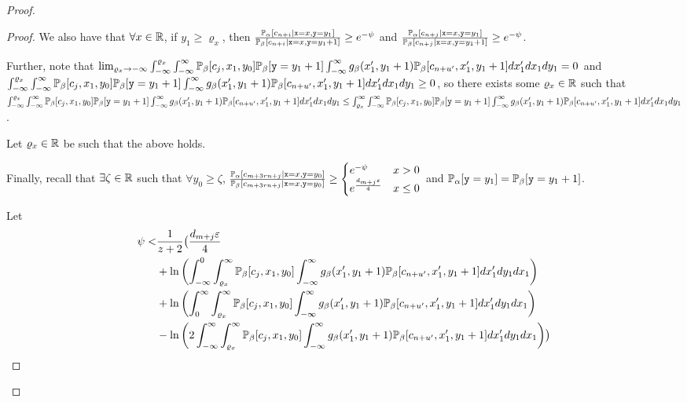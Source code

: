 \begin{proof}
\begin{proof}
		We also have that $\forall x\in \mathbb{R}$, if $y_1\geq \varrho_x$, then $\frac{\mathbb{P}_\alpha[c_{n+i}|\texttt{x}=x, \texttt{y}=y_1]}{\mathbb{P}_\beta[c_{n+i}|\texttt{x}=x, \texttt{y}=y_1+1]}\geq e^{-\psi}$ and $\frac{\mathbb{P}_\alpha[c_{n+j}|\texttt{x}=x, \texttt{y}=y_1]}{\mathbb{P}_\beta[c_{n+j}|\texttt{x}=x, \texttt{y}=y_1+1]}\geq e^{-\psi}$.

		Further, note that $
			\lim_{\varrho_x\to-\infty}\int_{-\infty}^{\varrho_x}\int_{-\infty}^{\infty}\mathbb{P}_\beta[c_{j}, x_1, y_0]\mathbb{P}_\beta[\texttt{y}=y_1+1]\int_{-\infty}^\infty g_\beta(x_1', y_1+1)\mathbb{P}_\beta[c_{n+u'}, x_1', y_1+1] dx_1' dx_1dy_1 = 0$ 
			and $\int_{-\infty}^{\varrho_x}\int_{-\infty}^{\infty}\mathbb{P}_\beta[c_{j}, x_1, y_0]\mathbb{P}_\beta[\texttt{y}=y_1+1]\int_{-\infty}^\infty g_\beta(x_1', y_1+1)\mathbb{P}_\beta[c_{n+u'}, x_1', y_1+1] dx_1' dx_1dy_1 \geq 0$,
		so there exists some $\varrho_x\in\mathbb{R}$ such that 
		$\int_{-\infty}^{\varrho_x}\int_{-\infty}^{\infty}\mathbb{P}_\beta[c_{j}, x_1, y_0]\mathbb{P}_\beta[\texttt{y}=y_1+1]\int_{-\infty}^\infty g_\beta(x_1', y_1+1)\mathbb{P}_\beta[c_{n+u'}, x_1', y_1+1] dx_1' dx_1dy_1 \leq \int_{\varrho_x}^\infty\int_{-\infty}^{\infty}\mathbb{P}_\beta[c_{j}, x_1, y_0]\mathbb{P}_\beta[\texttt{y}=y_1+1]\int_{-\infty}^\infty g_\beta(x_1', y_1+1)\mathbb{P}_\beta[c_{n+u'}, x_1', y_1+1] dx_1' dx_1dy_1$.

		Let $\varrho_x\in\mathbb{R}$ be such that the above holds. 

		Finally, recall that $\exists \zeta\in \mathbb{R}$ such that $\forall y_0\geq \zeta$, $\frac{\mathbb{P}_\alpha[c_{m+3rn+j}|\texttt{x} = x, \texttt{y} = y_0]}{\mathbb{P}_\beta[c_{m+3rn+j}|\texttt{x} = x, \texttt{y} = y_0]}\geq \begin{cases}
			e^{-\psi} & x > 0\\
			e^{\frac{d_{m+j}\varepsilon}{4}} & x\leq 0
		\end{cases}$ and $\mathbb{P}_\alpha[\texttt{y}=y_1] = \mathbb{P}_\beta[\texttt{y}=y_1+1]$.

		Let \begin{align*}
			\psi <& \frac{1}{z+2}\bigl(\frac{d_{m+j}\varepsilon}{4}\\
			&+\ln\left(\int_{-\infty}^{0}\int_{\varrho_x}^\infty\mathbb{P}_\beta[c_{j}, x_1, y_0]\int_{-\infty}^\infty g_\beta(x_1', y_1+1)\mathbb{P}_\beta[c_{n+u'}, x_1', y_1+1] dx_1' dy_1dx_1\right)\\
			&+\ln\left(\int_{0}^{\infty}\int_{\varrho_x}^\infty\mathbb{P}_\beta[c_{j}, x_1, y_0]\int_{-\infty}^\infty g_\beta(x_1', y_1+1)\mathbb{P}_\beta[c_{n+u'}, x_1', y_1+1] dx_1' dy_1dx_1\right)\\
			&-\ln\left(2\int_{-\infty}^{\infty}\int_{\varrho_x}^\infty\mathbb{P}_\beta[c_{j}, x_1, y_0]\int_{-\infty}^\infty g_\beta(x_1', y_1+1)\mathbb{P}_\beta[c_{n+u'}, x_1', y_1+1] dx_1' dy_1dx_1\right)\bigr)
		\end{align*}



\end{proof}
\end{proof}
